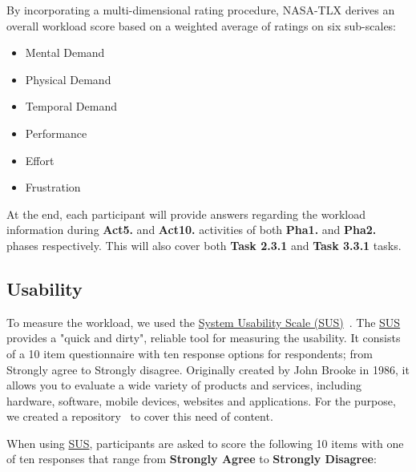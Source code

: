\hfill

By incorporating a multi-dimensional rating procedure, NASA-TLX derives an overall workload score based on a weighted average of ratings on six sub-scales:

\begin{itemize}
\item Mental Demand
\item Physical Demand
\item Temporal Demand
\item Performance
\item Effort
\item Frustration 
\end{itemize}

At the end, each participant will provide answers regarding the workload information during {\bf Act5.} and {\bf Act10.} activities of both {\bf Pha1.} and {\bf Pha2.} phases respectively. This will also cover both {\bf Task 2.3.1} and {\bf Task 3.3.1} tasks.


\subsection{Usability}

To measure the workload, we used the \hyperlink{https://en.wikipedia.org/wiki/System_usability_scale}{System Usability Scale (SUS)}~\cite{orfanou2015perceived}. The \hyperlink{https://en.wikipedia.org/wiki/System_usability_scale}{SUS} provides a "quick and dirty", reliable tool for measuring the usability. It consists of a 10 item questionnaire with ten response options for respondents; from Strongly agree to Strongly disagree.  Originally created by John Brooke in 1986, it allows you to evaluate a wide variety of products and services, including hardware, software, mobile devices, websites and applications. For the purpose, we created a repository~\cite{https://doi.org/10.13140/rg.2.2.26978.79044, francisco_maria_calisto_2018_1435042} to cover this need of content.

\hfill

When using \hyperlink{https://en.wikipedia.org/wiki/System_usability_scale}{SUS}, participants are asked to score the following 10 items with one of ten responses that range from {\bf Strongly Agree} to {\bf Strongly Disagree}:

